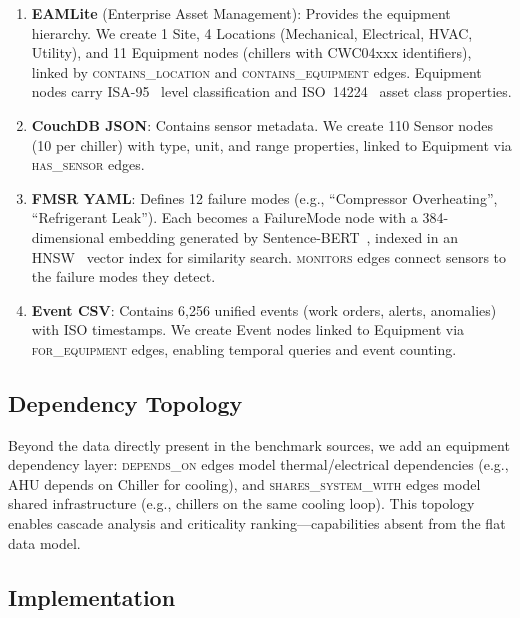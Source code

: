 \documentclass[11pt]{article}
\begin{document}
\begin{enumerate}[leftmargin=*]
  \item \textbf{EAMLite} (Enterprise Asset Management): Provides the equipment hierarchy. We create 1 Site, 4 Locations (Mechanical, Electrical, HVAC, Utility), and 11 Equipment nodes (chillers with CWC04xxx identifiers), linked by \textsc{contains\_location} and \textsc{contains\_equipment} edges. Equipment nodes carry ISA-95~\citep{isa95} level classification and ISO~14224~\citep{iso14224} asset class properties.

  \item \textbf{CouchDB JSON}: Contains sensor metadata. We create 110 Sensor nodes (10 per chiller) with type, unit, and range properties, linked to Equipment via \textsc{has\_sensor} edges.

  \item \textbf{FMSR YAML}: Defines 12 failure modes (e.g., ``Compressor Overheating'', ``Refrigerant Leak''). Each becomes a FailureMode node with a 384-dimensional embedding generated by Sentence-BERT~\citep{reimers2019sentencebert}, indexed in an HNSW~\citep{malkov2020hnsw} vector index for similarity search. \textsc{monitors} edges connect sensors to the failure modes they detect.

  \item \textbf{Event CSV}: Contains 6{,}256 unified events (work orders, alerts, anomalies) with ISO timestamps. We create Event nodes linked to Equipment via \textsc{for\_equipment} edges, enabling temporal queries and event counting.
\end{enumerate}

\subsection{Dependency Topology}

Beyond the data directly present in the benchmark sources, we add an equipment dependency layer: \textsc{depends\_on} edges model thermal/electrical dependencies (e.g., AHU depends on Chiller for cooling), and \textsc{shares\_system\_with} edges model shared infrastructure (e.g., chillers on the same cooling loop). This topology enables cascade analysis and criticality ranking---capabilities absent from the flat data model.

\subsection{Implementation}
\end{document}
